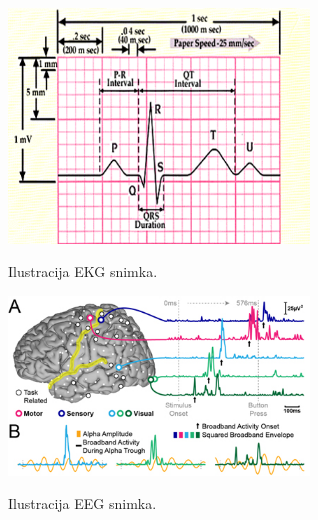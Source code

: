 \documentclass[a4paper]{article}
\begin{document}
\begin{figure}[t]
\includegraphics[width=8cm]{Pictures/ecg-paper.png}
\centering
\label{fig:ecgpaper}
\caption{Ilustracija EKG snimka.}
\end{figure}

\begin{figure}[t]
\includegraphics[width=8cm]{Pictures/eeg.jpg}
\centering
\label{fig:eeg}
\caption{Ilustracija EEG snimka.}
\end{figure}
\end{document}
